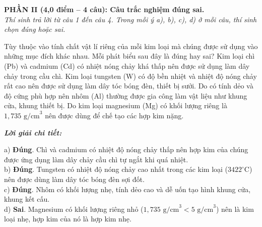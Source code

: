 \documentclass[11pt,a4paper]{article}
\def\loigiai#1{
\par\begingroup\color{blue!80!black}\small
\noindent\textbf{\textit{Lời giải chi tiết:}}\par
#1\par\endgroup}
\begin{document}
\noindent
\textbf{PHẦN II (4,0 điểm -- 4 câu): Câu trắc nghiệm đúng sai.}\\
\textit{Thí sinh trả lời từ câu 1 đến câu 4. Trong mỗi ý a), b), c), d) ở mỗi câu, thí sinh chọn đúng hoặc sai.}

\setcounter{ex}{0}

\begin{ex}
Tùy thuộc vào tính chất vật lí riêng của mỗi kim loại mà chúng được sử dụng vào những mục đích khác nhau. Mỗi phát biểu sau đây là đúng hay sai?
\choiceTF
{\True Kim loại chì (Pb) và cadmium (Cd) có nhiệt nóng chảy khá thấp nên được sử dụng làm dây chảy trong cầu chì.}
{\True Kim loại tungsten (W) có độ bền nhiệt và nhiệt độ nóng chảy rất cao nên được sử dụng làm dây tóc bóng đèn, thiết bị sưởi.}
{\True Do có tính dẻo và độ cứng phù hợp nên nhôm (Al) thường được gia công làm vật liệu như khung cửa, khung thiết bị.}
{Do kim loại magnesium (Mg) có khối lượng riêng là $1{,}735\text{ g/cm}^3$ nên được dùng để chế tạo các hợp kim nặng.}
\loigiai{
a) \textbf{Đúng}. Chì và cadmium có nhiệt độ nóng chảy thấp nên hợp kim của chúng được ứng dụng làm dây chảy cầu chì tự ngắt khi quá nhiệt.\\
b) \textbf{Đúng}. Tungsten có nhiệt độ nóng chảy cao nhất trong các kim loại ($3422^\circ\text{C}$) nên được dùng làm dây tóc bóng đèn sợi đốt.\\
c) \textbf{Đúng}. Nhôm có khối lượng nhẹ, tính dẻo cao và dễ uốn tạo hình khung cửa, khung kết cấu.\\
d) \textbf{Sai}. Magnesium có khối lượng riêng nhỏ ($1{,}735\text{ g/cm}^3 < 5\text{ g/cm}^3$) nên là kim loại nhẹ, hợp kim của nó là hợp kim nhẹ.}
\end{ex}
\end{document}
